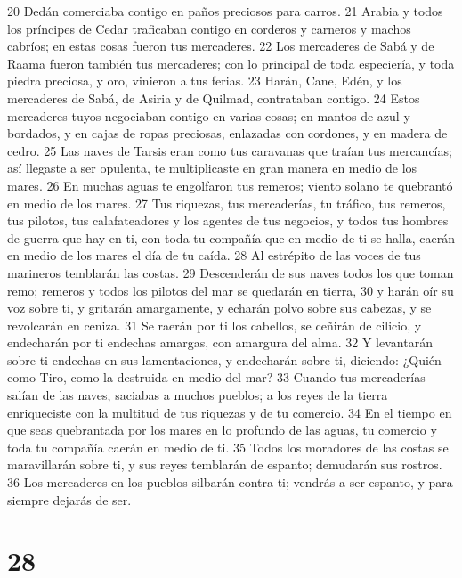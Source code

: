 20 Dedán comerciaba contigo en paños preciosos para carros.
21 Arabia y todos los príncipes de Cedar traficaban contigo en corderos y carneros y machos cabríos; en estas cosas fueron tus mercaderes.
22 Los mercaderes de Sabá y de Raama fueron también tus mercaderes; con lo principal de toda especiería, y toda piedra preciosa, y oro, vinieron a tus ferias.
23 Harán, Cane, Edén, y los mercaderes de Sabá, de Asiria y de Quilmad, contrataban contigo.
24 Estos mercaderes tuyos negociaban contigo en varias cosas; en mantos de azul y bordados, y en cajas de ropas preciosas, enlazadas con cordones, y en madera de cedro.
25 Las naves de Tarsis eran como tus caravanas que traían tus mercancías; así llegaste a ser opulenta, te multiplicaste en gran manera en medio de los mares.
26 En muchas aguas te engolfaron tus remeros; viento solano te quebrantó en medio de los mares.
27 Tus riquezas, tus mercaderías, tu tráfico, tus remeros, tus pilotos, tus calafateadores y los agentes de tus negocios, y todos tus hombres de guerra que hay en ti, con toda tu compañía que en medio de ti se halla, caerán en medio de los mares el día de tu caída.
28 Al estrépito de las voces de tus marineros temblarán las costas.
29 Descenderán de sus naves todos los que toman remo; remeros y todos los pilotos del mar se quedarán en tierra,
30 y harán oír su voz sobre ti, y gritarán amargamente, y echarán polvo sobre sus cabezas, y se revolcarán en ceniza.
31 Se raerán por ti los cabellos, se ceñirán de cilicio, y endecharán por ti endechas amargas, con amargura del alma.
32 Y levantarán sobre ti endechas en sus lamentaciones, y endecharán sobre ti, diciendo: ¿Quién como Tiro, como la destruida en medio del mar?
33 Cuando tus mercaderías salían de las naves, saciabas a muchos pueblos; a los reyes de la tierra enriqueciste con la multitud de tus riquezas y de tu comercio.
34 En el tiempo en que seas quebrantada por los mares en lo profundo de las aguas, tu comercio y toda tu compañía caerán en medio de ti.
35 Todos los moradores de las costas se maravillarán sobre ti, y sus reyes temblarán de espanto; demudarán sus rostros.
36 Los mercaderes en los pueblos silbarán contra ti; vendrás a ser espanto, y para siempre dejarás de ser. 

\chapter{28}

